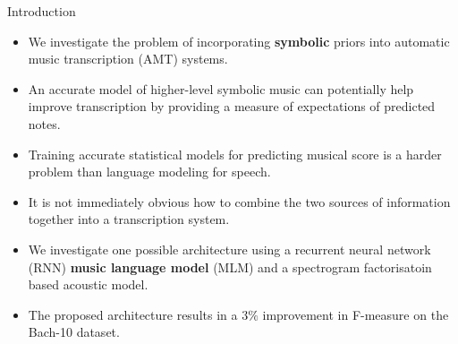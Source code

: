 \documentclass[final]{beamer}
\newlength{\onecolwid}
\begin{document}
\begin{frame}[t]
\begin{columns}[t]
\begin{column}{\onecolwid}
\begin{block}{Introduction}

\begin{itemize}
\item We investigate the problem of incorporating \textbf{symbolic} priors into automatic music transcription (AMT) systems.
\item An accurate model of higher-level symbolic music can potentially help improve transcription by providing a measure of expectations of predicted notes. 
\item Training accurate statistical models for predicting musical score is a harder problem than language modeling for speech. 
\item It is not immediately obvious how to combine the two sources of information together into a transcription system. 
\item We investigate one possible architecture using a recurrent neural network (RNN) \textbf{music language model} (MLM) and a spectrogram factorisatoin based acoustic model. 
\item The proposed architecture results in a $3\%$ improvement in F-measure on the Bach-10 dataset. 
\end{itemize}

\end{block}


\end{column}
\end{columns}
\end{frame}
\end{document}
